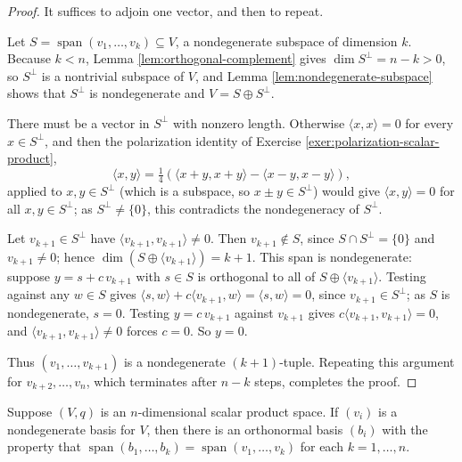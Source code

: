 \begin{proof}
\leanok
{}
It suffices to adjoin one vector, and then to repeat.

Let $S = \operatorname{span}(v_1,\ldots,v_k) \subseteq V$, a nondegenerate subspace of dimension $k$. Because $k < n$, Lemma \ref{lem:orthogonal-complement} gives $\dim S^\perp = n - k > 0$, so $S^\perp$ is a nontrivial subspace of $V$, and Lemma \ref{lem:nondegenerate-subspace} shows that $S^\perp$ is nondegenerate and $V = S \oplus S^\perp$.

There must be a vector in $S^\perp$ with nonzero length. Otherwise $\langle x,x\rangle = 0$ for every $x \in S^\perp$, and then the polarization identity of Exercise \ref{exer:polarization-scalar-product},
\[
\langle x,y \rangle = \tfrac14\left(\langle x+y,x+y\rangle - \langle x-y,x-y\rangle\right),
\]
applied to $x, y \in S^\perp$ (which is a subspace, so $x \pm y \in S^\perp$) would give $\langle x,y\rangle = 0$ for all $x,y \in S^\perp$; as $S^\perp \neq \{0\}$, this contradicts the nondegeneracy of $S^\perp$.

Let $v_{k+1} \in S^\perp$ have $\langle v_{k+1},v_{k+1}\rangle \neq 0$. Then $v_{k+1} \notin S$, since $S \cap S^\perp = \{0\}$ and $v_{k+1} \neq 0$; hence $\dim(S \oplus \langle v_{k+1}\rangle) = k+1$. This span is nondegenerate: suppose $y = s + c\,v_{k+1}$ with $s \in S$ is orthogonal to all of $S \oplus \langle v_{k+1}\rangle$. Testing against any $w \in S$ gives $\langle s,w\rangle + c\langle v_{k+1},w\rangle = \langle s,w\rangle = 0$, since $v_{k+1} \in S^\perp$; as $S$ is nondegenerate, $s = 0$. Testing $y = c\,v_{k+1}$ against $v_{k+1}$ gives $c\langle v_{k+1},v_{k+1}\rangle = 0$, and $\langle v_{k+1},v_{k+1}\rangle \neq 0$ forces $c = 0$. So $y = 0$.

Thus $(v_1,\ldots,v_{k+1})$ is a nondegenerate $(k+1)$-tuple. Repeating this argument for $v_{k+2},\ldots,v_n$, which terminates after $n-k$ steps, completes the proof.
\end{proof}


\begin{proposition}
\label{prop:gram-schmidt-algorithm-scalar-products}
\leanok
{}
Suppose $(V, q)$ is an $n$-dimensional scalar product space. If $(v_i)$ is a nondegenerate basis for $V$, then there is an orthonormal basis $(b_i)$ with the property that $\operatorname{span}(b_1, \ldots, b_k) = \operatorname{span}(v_1, \ldots, v_k)$ for each $k = 1, \ldots, n$.
\end{proposition}

